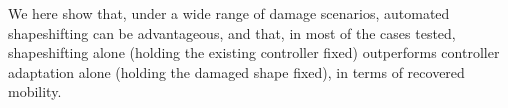 We here show that, under a wide range of damage scenarios, automated shapeshifting can be advantageous, and that, in most of the cases tested, shapeshifting alone (holding the existing controller fixed) outperforms controller adaptation alone (holding the damaged shape fixed), in terms of recovered mobility.


